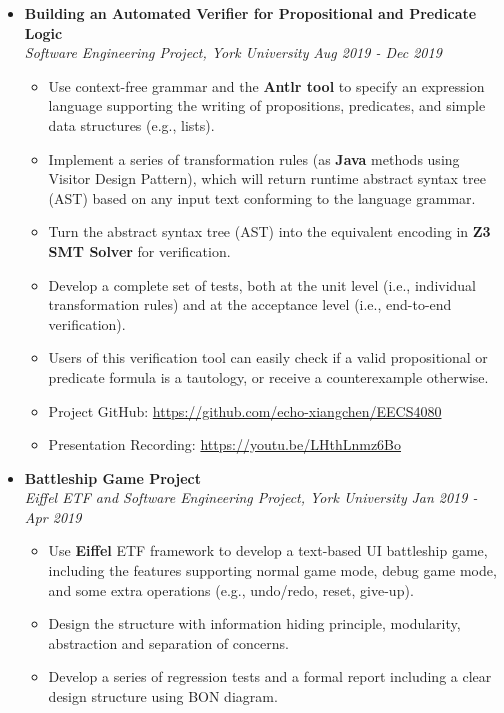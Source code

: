 \documentclass[a4paper,10pt,titlepage]{article}
\begin{document}
\begin{itemize}%
	\item {\bf Building an Automated Veriﬁer for Propositional and Predicate Logic}
	\\\emph {Software Engineering Project, York University} {\hfill \emph{Aug 2019 - Dec 2019}}
	\begin{itemize}%
		\item Use context-free grammar and the {\bf Antlr tool} to specify an expression language supporting the writing of propositions, predicates, and simple data structures (e.g., lists).
		\item Implement a series of transformation rules (as {\bf Java} methods using Visitor Design Pattern), which will return runtime abstract syntax tree (AST) based on any input text conforming to the language grammar.
		\item Turn the abstract syntax tree (AST) into the equivalent encoding in {\bf Z3 SMT Solver} for verification.
		\item Develop a complete set of tests, both at the unit level (i.e., individual transformation rules) and at the acceptance level (i.e., end-to-end verification).
		\item Users of this veriﬁcation tool can easily check if a valid propositional or predicate formula is a tautology, or receive a counterexample otherwise.
		\item Project GitHub: \url{https://github.com/echo-xiangchen/EECS4080}
		\item Presentation Recording: \url{https://youtu.be/LHthLnmz6Bo}
	\end{itemize}
\end{itemize}
\begin{itemize}%
	\item {\bf Battleship Game Project}
	\\\emph {Eiffel ETF and Software Engineering Project, York University} {\hfill \emph{Jan 2019 - Apr 2019}}
	\begin{itemize}%
		\item Use {\bf Eiffel} ETF framework to develop a text-based UI battleship game, including the features supporting normal game mode, debug game mode, and some extra operations (e.g., undo/redo, reset, give-up).
		\item Design the structure with information hiding principle, modularity, abstraction and separation of concerns.
		\item Develop a series of regression tests and a formal report including a clear design structure using BON diagram.
	\end{itemize}
\end{itemize}
\end{document}

